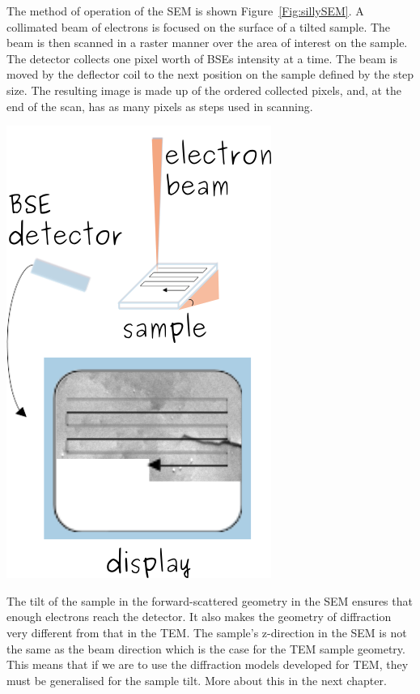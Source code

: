 \noindent\begin{minipage}{0.5\textwidth}
The method of operation of the SEM is shown Figure~\ref{Fig:sillySEM}. A collimated beam of electrons is focused on the surface of a tilted sample. The beam is then scanned in a raster manner over the area of interest on the sample. The detector collects one pixel worth of BSEs intensity at a time. The beam is moved by the deflector coil to the next position on the sample defined by the step size. The resulting image is made up of the ordered collected pixels, and, at the end of the scan, has as many pixels as steps used in scanning.  
\end{minipage}%
\begin{minipage}{0.5\textwidth}
    \centering
\includegraphics[width=0.48\linewidth]{Figures/sillySEM.png}
\captionsetup{width=.7\linewidth}
\label{Fig:sillySEM}
\end{minipage}

\vspace{0.4cm}



The tilt of the sample in the forward-scattered geometry in the SEM ensures that  enough electrons reach the detector. It also makes the geometry of diffraction very different from that in the TEM. The sample's z-direction in the SEM is not the same as the beam direction which is the case for the TEM sample geometry. This means that if we are to use the diffraction models developed for TEM, they must be generalised for the sample tilt.  More about this in the next chapter. 

